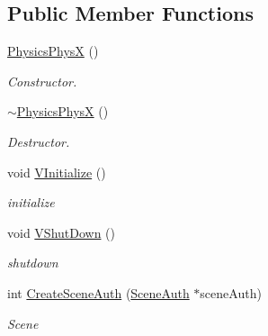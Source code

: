 \subsection*{Public Member Functions}
\begin{DoxyCompactItemize}
\item 
\hypertarget{classContent_1_1Physics_1_1PhysicsPhysX_a31d453b4d6dbcf8854e652f60118ac58}{
\hyperlink{classContent_1_1Physics_1_1PhysicsPhysX_a31d453b4d6dbcf8854e652f60118ac58}{PhysicsPhysX} ()}
\label{classContent_1_1Physics_1_1PhysicsPhysX_a31d453b4d6dbcf8854e652f60118ac58}

\begin{DoxyCompactList}\small\item\em Constructor. \item\end{DoxyCompactList}\item 
\hypertarget{classContent_1_1Physics_1_1PhysicsPhysX_ae73a96cc0525b97cf43e99cf0c3f47f1}{
\hyperlink{classContent_1_1Physics_1_1PhysicsPhysX_ae73a96cc0525b97cf43e99cf0c3f47f1}{$\sim$PhysicsPhysX} ()}
\label{classContent_1_1Physics_1_1PhysicsPhysX_ae73a96cc0525b97cf43e99cf0c3f47f1}

\begin{DoxyCompactList}\small\item\em Destructor. \item\end{DoxyCompactList}\item 
\hypertarget{classContent_1_1Physics_1_1PhysicsPhysX_a91c94ece2d7346e3c2a7fc183477ecfb}{
void \hyperlink{classContent_1_1Physics_1_1PhysicsPhysX_a91c94ece2d7346e3c2a7fc183477ecfb}{VInitialize} ()}
\label{classContent_1_1Physics_1_1PhysicsPhysX_a91c94ece2d7346e3c2a7fc183477ecfb}

\begin{DoxyCompactList}\small\item\em initialize \item\end{DoxyCompactList}\item 
\hypertarget{classContent_1_1Physics_1_1PhysicsPhysX_a2c40d2fbab30bd91794dfdc912d26e50}{
void \hyperlink{classContent_1_1Physics_1_1PhysicsPhysX_a2c40d2fbab30bd91794dfdc912d26e50}{VShutDown} ()}
\label{classContent_1_1Physics_1_1PhysicsPhysX_a2c40d2fbab30bd91794dfdc912d26e50}

\begin{DoxyCompactList}\small\item\em shutdown \item\end{DoxyCompactList}\item 
\hypertarget{classContent_1_1Physics_1_1PhysicsPhysX_af43bb2239aef7e8934f582a77f390c18}{
int \hyperlink{classContent_1_1Physics_1_1PhysicsPhysX_af43bb2239aef7e8934f582a77f390c18}{CreateSceneAuth} (\hyperlink{classContent_1_1SceneAuth}{SceneAuth} $\ast$sceneAuth)}
\label{classContent_1_1Physics_1_1PhysicsPhysX_af43bb2239aef7e8934f582a77f390c18}

\begin{DoxyCompactList}\small\item\em Scene \item\end{DoxyCompactList}\end{DoxyCompactItemize}
